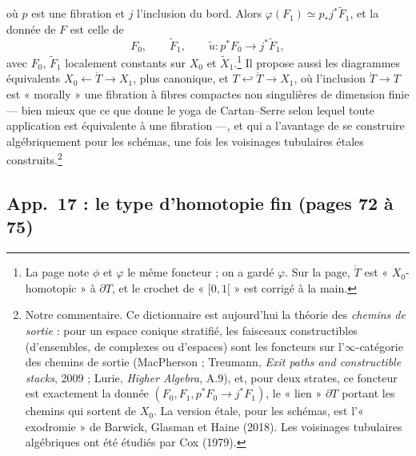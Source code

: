 \documentclass[11pt,a4paper]{article}
\begin{document}

où $p$ est une fibration et $j$ l'inclusion du bord. Alors
$\varphi(F_1) \simeq p_*j^*\widetilde F_1$, et la donnée de $F$ est celle
de
\[
F_0, \qquad \widetilde F_1, \qquad \tilde u : p^*F_0 \to j^*\widetilde F_1,
\]
avec $F_0$, $\widetilde F_1$ localement constants sur $X_0$ et
$\widetilde X_1$.\footnote{La page note $\phi$ et $\varphi$ le même foncteur ;
on a gardé $\varphi$. Sur la page, $\mathring T$ est « $X_0$-homotopic » à
$\partial T$, et le crochet de « $[0,1[$ » est corrigé à la main.} Il
propose aussi les diagrammes équivalents
$X_0 \leftarrow \mathring T \to X_1$, plus canonique, et
$T \hookleftarrow \mathring T \to X_1$, où l'inclusion
$\mathring T \to T$ est « morally » une fibration à fibres compactes
non singulières de dimension finie --- bien mieux que ce que donne le yoga
de Cartan--Serre selon lequel toute application est équivalente à une
fibration ---, et qui a l'avantage de se construire algébriquement pour les
schémas, une fois les voisinages tubulaires étales
construits.\footnote{Notre commentaire. Ce dictionnaire est aujourd'hui la
théorie des \emph{chemins de sortie} : pour un espace conique stratifié, les
faisceaux constructibles (d'ensembles, de complexes ou d'espaces) sont les
foncteurs sur l'$\infty$-catégorie des chemins de sortie (MacPherson ;
Treumann, \emph{Exit paths and constructible stacks}, 2009 ; Lurie,
\emph{Higher Algebra}, A.9), et, pour deux strates, ce foncteur est
exactement la donnée $(F_0, F_1, p^*F_0 \to j^*F_1)$, le « lien » $\partial T$
portant les chemins qui sortent de $X_0$. La version étale, pour les
schémas, est l'« exodromie » de Barwick, Glasman et Haine (2018). Les
voisinages tubulaires algébriques ont été étudiés par Cox (1979).}

\subsection*{App.~17 : le type d'homotopie fin (pages 72 à 75)}
\end{document}
